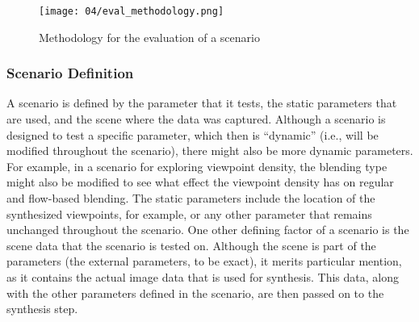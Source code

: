 \begin{figure}
		\centering
		\texttt{[image: 04/eval\_methodology.png]}
		\caption{Methodology for the evaluation of a scenario}
		\label{fig:eval-methodology}
\end{figure}

\subsubsection{Scenario Definition}
A scenario is defined by the parameter that it tests, the static parameters that are used, and the scene where the data was captured. Although a scenario is designed to test a specific parameter, which then is ``dynamic'' (i.e., will be modified throughout the scenario), there might also be more dynamic parameters. For example, in a scenario for exploring viewpoint density, the blending type might also be modified to see what effect the viewpoint density has on regular and flow-based blending. The static parameters include the location of the synthesized viewpoints, for example, or any other parameter that remains unchanged throughout the scenario. One other defining factor of a scenario is the scene data that the scenario is tested on. Although the scene is part of the parameters (the external parameters, to be exact), it merits particular mention, as it contains the actual image data that is used for synthesis. This data, along with the other parameters defined in the scenario, are then passed on to the synthesis step.



